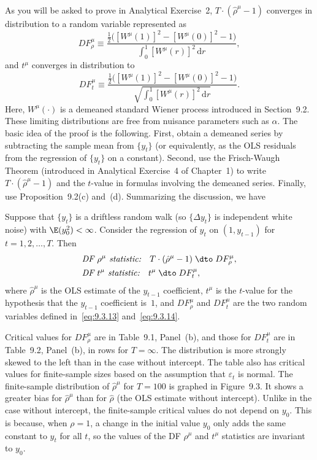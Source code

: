 As you will be asked to prove in Analytical Exercise~2, $T \cdot (\hat{\rho}^\mu - 1)$ converges
in distribution to a random variable represented as
\begin{equation}
\label{eq:9.3.13}
DF_\rho^\mu \equiv \frac{\tfrac{1}{2}\big([W^\mu(1)]^2 - [W^\mu(0)]^2 - 1\big)}{\int_0^1 [W^\mu(r)]^2\,\mathrm{d}r},
\end{equation}
and $t^\mu$ converges in distribution to
\begin{equation}
\label{eq:9.3.14}
DF_t^\mu \equiv \frac{\tfrac{1}{2}\big([W^\mu(1)]^2 - [W^\mu(0)]^2 - 1\big)}{\sqrt{\int_0^1 [W^\mu(r)]^2\,\mathrm{d}r}}.
\end{equation}
Here, $W^\mu(\cdot)$ is a demeaned standard Wiener process introduced in Section~9.2.
These limiting distributions are free from nuisance parameters such as $\alpha$. The
basic idea of the proof is the following. First, obtain a demeaned series by subtracting the sample mean from $\{y_t\}$ (or equivalently, as the OLS residuals from the
regression of $\{y_t\}$ on a constant). Second, use the Frisch-Waugh Theorem (introduced in Analytical Exercise~4 of Chapter~1) to write $T \cdot (\hat{\rho}^\mu - 1)$ and the $t$-value
in formulas involving the demeaned series. Finally, use Proposition~9.2(c) and~(d).
Summarizing the discussion, we have

\begin{proposition}
\label{prop:9.4}
Suppose that $\{y_t\}$ is a driftless random walk (so $\{\Delta y_t\}$ is independent white noise) with $\E(y_0^2) < \infty$. Consider the regression of $y_t$ on $(1, y_{t-1})$ for
$t = 1, 2, \ldots, T$. Then
\begin{align}
&\textit{DF $\rho^\mu$ statistic:}\quad T \cdot (\hat{\rho}^\mu - 1) \;\dto\; DF_\rho^\mu, \notag \\
&\textit{DF $t^\mu$ statistic:}\quad t^\mu \;\dto\; DF_t^\mu, \notag
\end{align}
where $\hat{\rho}^\mu$ is the OLS estimate of the $y_{t-1}$ coefficient, $t^\mu$ is the $t$-value for the
hypothesis that the $y_{t-1}$ coefficient is~$1$, and $DF_\rho^\mu$ and $DF_t^\mu$ are the two random
variables defined in~\eqref{eq:9.3.13} and~\eqref{eq:9.3.14}.
\end{proposition}

Critical values for $DF_\rho^\mu$ are in Table~9.1, Panel~(b), and those for $DF_t^\mu$ are in
Table~9.2, Panel~(b), in rows for $T = \infty$. The distribution is more strongly skewed
to the left than in the case without intercept. The table also has critical values for
finite-sample sizes based on the assumption that $\varepsilon_t$ is normal. The finite-sample
distribution of $\hat{\rho}^\mu$ for $T = 100$ is graphed in Figure~9.3. It shows a greater bias
for $\hat{\rho}^\mu$ than for $\hat{\rho}$ (the OLS estimate without intercept). Unlike in the case without
intercept, the finite-sample critical values do not depend on $y_0$. This is because,
when $\rho = 1$, a change in the initial value $y_0$ only adds the same constant to $y_t$ for
all $t$, so the values of the DF $\rho^\mu$ and $t^\mu$ statistics are invariant to $y_0$.

